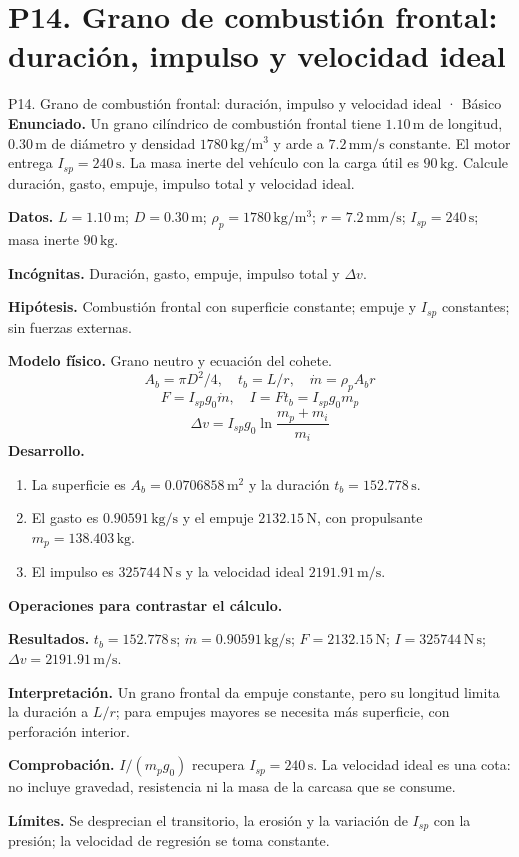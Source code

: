 \section{P14. Grano de combustión frontal: duración, impulso y velocidad ideal}
\begin{studiumworked}{P14. Grano de combustión frontal: duración, impulso y velocidad ideal · Básico}
\textbf{Enunciado.} Un grano cilíndrico de combustión frontal tiene $1.10\,\mathrm m$ de longitud, $0.30\,\mathrm m$ de diámetro y densidad $1780\,\mathrm{kg/m^3}$ y arde a $7.2\,\mathrm{mm/s}$ constante. El motor entrega $I_{sp}=240\,\mathrm s$. La masa inerte del vehículo con la carga útil es $90\,\mathrm{kg}$. Calcule duración, gasto, empuje, impulso total y velocidad ideal.

\textbf{Datos.} $L=1.10\,\mathrm m$; $D=0.30\,\mathrm m$; $\rho_p=1780\,\mathrm{kg/m^3}$; $r=7.2\,\mathrm{mm/s}$; $I_{sp}=240\,\mathrm s$; masa inerte $90\,\mathrm{kg}$.

\textbf{Incógnitas.} Duración, gasto, empuje, impulso total y $\Delta v$.

\textbf{Hipótesis.} Combustión frontal con superficie constante; empuje y $I_{sp}$ constantes; sin fuerzas externas.

\textbf{Modelo físico.} Grano neutro y ecuación del cohete.
\[A_b=\pi D^2/4,\quad t_b=L/r,\quad \dot m=\rho_pA_br\]
\[F=I_{sp}g_0\dot m,\quad I=Ft_b=I_{sp}g_0m_p\]
\[\Delta v=I_{sp}g_0\ln\frac{m_p+m_i}{m_i}\]
\textbf{Desarrollo.}
\begin{enumerate}
\item La superficie es $A_b=0.0706858\,\mathrm{m^2}$ y la duración $t_b=152.778\,\mathrm s$.
\item El gasto es $0.90591\,\mathrm{kg/s}$ y el empuje $2132.15\,\mathrm N$, con propulsante $m_p=138.403\,\mathrm{kg}$.
\item El impulso es $325744\,\mathrm{N\,s}$ y la velocidad ideal $2191.91\,\mathrm{m/s}$.
\end{enumerate}
\textbf{Operaciones para contrastar el cálculo.}

\textbf{Resultados.} $t_b=152.778\,\mathrm s$; $\dot m=0.90591\,\mathrm{kg/s}$; $F=2132.15\,\mathrm N$; $I=325744\,\mathrm{N\,s}$; $\Delta v=2191.91\,\mathrm{m/s}$.

\textbf{Interpretación.} Un grano frontal da empuje constante, pero su longitud limita la duración a $L/r$; para empujes mayores se necesita más superficie, con perforación interior.

\textbf{Comprobación.} $I/(m_pg_0)$ recupera $I_{sp}=240\,\mathrm s$. La velocidad ideal es una cota: no incluye gravedad, resistencia ni la masa de la carcasa que se consume.

\textbf{Límites.} Se desprecian el transitorio, la erosión y la variación de $I_{sp}$ con la presión; la velocidad de regresión se toma constante.
\end{studiumworked}
